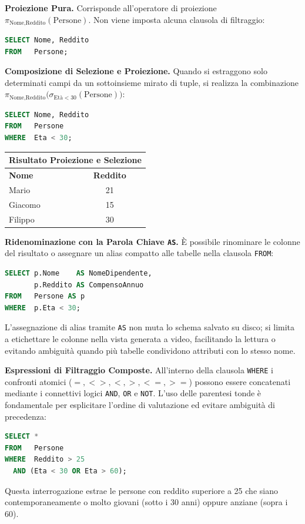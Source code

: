 \documentclass[12pt]{extarticle}
\begin{document}
\medskip
\noindent \textbf{Proiezione Pura.} Corrisponde all'operatore di proiezione $\pi_{\text{Nome}, \text{Reddito}}(\text{Persone})$. Non viene imposta alcuna clausola di filtraggio:
\begin{lstlisting}[language=SQL]
SELECT Nome, Reddito
FROM   Persone;
\end{lstlisting}

\medskip
\noindent \textbf{Composizione di Selezione e Proiezione.} Quando si estraggono solo determinati campi da un sottoinsieme mirato di tuple, si realizza la combinazione $\pi_{\text{Nome}, \text{Reddito}}\big(\sigma_{\text{Età} < 30}(\text{Persone})\big)$:
\begin{lstlisting}[language=SQL]
SELECT Nome, Reddito
FROM   Persone
WHERE  Eta < 30;
\end{lstlisting}

\begin{center}
\small
\begin{tabular}{lc}
    \toprule
    \multicolumn{2}{c}{\textbf{Risultato Proiezione e Selezione}} \\
    \midrule
    \textbf{Nome} & \textbf{Reddito} \\
    \midrule
    Mario   & 21 \\
    Giacomo & 15 \\
    Filippo & 30 \\
    \bottomrule
\end{tabular}
\end{center}

\medskip
\noindent \textbf{Ridenominazione con la Parola Chiave \texttt{AS}.} È possibile rinominare le colonne del risultato o assegnare un alias compatto alle tabelle nella clausola \texttt{FROM}:
\begin{lstlisting}[language=SQL]
SELECT p.Nome    AS NomeDipendente,
       p.Reddito AS CompensoAnnuo
FROM   Persone AS p
WHERE  p.Eta < 30;
\end{lstlisting}
L'assegnazione di alias tramite \texttt{AS} non muta lo schema salvato su disco; si limita a etichettare le colonne nella vista generata a video, facilitando la lettura o evitando ambiguità quando più tabelle condividono attributi con lo stesso nome.

\noindent \textbf{Espressioni di Filtraggio Composte.} All'interno della clausola \texttt{WHERE} i confronti atomici ($=, <>, <, >, <=, >=$) possono essere concatenati mediante i connettivi logici \texttt{AND}, \texttt{OR} e \texttt{NOT}. L'uso delle parentesi tonde è fondamentale per esplicitare l'ordine di valutazione ed evitare ambiguità di precedenza:
\begin{lstlisting}[language=SQL]
SELECT *
FROM   Persone
WHERE  Reddito > 25 
  AND (Eta < 30 OR Eta > 60);
\end{lstlisting}
Questa interrogazione estrae le persone con reddito superiore a 25 che siano contemporaneamente o molto giovani (sotto i 30 anni) oppure anziane (sopra i 60).
\end{document}
